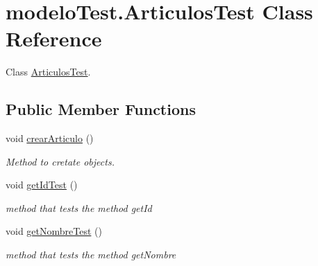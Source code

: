 \hypertarget{classmodelo_test_1_1_articulos_test}{}\section{modelo\+Test.\+Articulos\+Test Class Reference}
\label{classmodelo_test_1_1_articulos_test}


Class \mbox{\hyperlink{classmodelo_test_1_1_articulos_test}{Articulos\+Test}}.  


\subsection*{Public Member Functions}
\begin{DoxyCompactItemize}
\item 
\mbox{\label{classmodelo_test_1_1_articulos_test_a846cb5c047bea230f8e351b2c12a0543}} 
void \mbox{\hyperlink{classmodelo_test_1_1_articulos_test_a846cb5c047bea230f8e351b2c12a0543}{crear\+Articulo}} ()
\begin{DoxyCompactList}\small\item\em Method to cretate objects. \end{DoxyCompactList}\item 
\mbox{\label{classmodelo_test_1_1_articulos_test_a805a40dbacae0f8177169aa47768c633}} 
void \mbox{\hyperlink{classmodelo_test_1_1_articulos_test_a805a40dbacae0f8177169aa47768c633}{get\+Id\+Test}} ()
\begin{DoxyCompactList}\small\item\em method that tests the method get\+Id \end{DoxyCompactList}\item 
\mbox{\label{classmodelo_test_1_1_articulos_test_a48c0712285ddd750fe5f45390d5ccf48}} 
void \mbox{\hyperlink{classmodelo_test_1_1_articulos_test_a48c0712285ddd750fe5f45390d5ccf48}{get\+Nombre\+Test}} ()
\begin{DoxyCompactList}\small\item\em method that tests the method get\+Nombre \end{DoxyCompactList}\item 
\mbox{\label{classmodelo_test_1_1_articulos_test_ad0c98f454266688a9c8cfe1659c9a649}} 

\end{DoxyCompactItemize}
